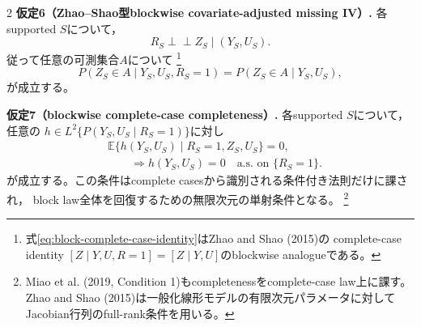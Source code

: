 \documentclass[a4paper,10pt]{article}
\newcommand{\E}{\mathbb E}
\newcommand{\indep}{\mathrel{\perp\!\!\!\perp}}
\begin{document}
\begin{multicols}{2}
\noindent\textbf{仮定6（Zhao--Shao型blockwise covariate-adjusted missing IV）.}
各supported $S$について，
\begin{equation}
R_S\indep Z_S\mid(Y_S,U_S).
\label{eq:block-missing-iv-independence}
\end{equation}
従って任意の可測集合$A$について%
\footnote{式\eqref{eq:block-complete-case-identity}はZhao and Shao (2015)の
complete-case identity $[Z\mid Y,U,R=1]=[Z\mid Y,U]$のblockwise analogueである。}
\begin{equation}
P(Z_S\in A\mid Y_S,U_S,R_S=1)
=P(Z_S\in A\mid Y_S,U_S),
\label{eq:block-complete-case-identity}
\end{equation}
が成立する。

\noindent\textbf{仮定7（blockwise complete-case completeness）.}
各supported $S$について，任意の
$h\in L^2\{P(Y_S,U_S\mid R_S=1)\}$に対し
\begin{equation}
\begin{aligned}
&\E\{h(Y_S,U_S)\mid R_S=1,Z_S,U_S\}=0,\\
&\qquad\Longrightarrow h(Y_S,U_S)=0
\quad\text{a.s. on }\{R_S=1\}.
\end{aligned}
\label{eq:block-complete-case-completeness}
\end{equation}
が成立する。この条件はcomplete casesから識別される条件付き法則だけに課され，
block law全体を回復するための無限次元の単射条件となる。%
\footnote{Miao et al. (2019, Condition 1)もcompletenessをcomplete-case law上に課す。
Zhao and Shao (2015)は一般化線形モデルの有限次元パラメータに対して
Jacobian行列のfull-rank条件を用いる。}

\begin{center}
\begin{minipage}{\linewidth}
\centering
\resizebox{\linewidth}{!}{}
\label{fig:supported-blocks-dag}
\end{minipage}
\end{center}


\end{multicols}
\end{document}
